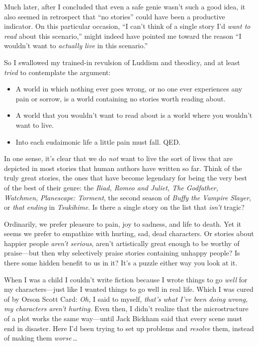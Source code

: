  Much later, after I concluded that even a safe genie
wasn't such a good idea, it also seemed in retrospect
that ``no stories'' could have been
a productive indicator. On this particular occasion,
``I can't think of a single story
I'd \textit{want to read} about this
scenario,'' might indeed have pointed me toward the
reason ``I wouldn't want to
\textit{actually live} in this scenario.''


 So I swallowed my trained-in revulsion of Luddism and theodicy,
and at least \textit{tried} to contemplate the argument:

\begin{itemize}
\item {
 A world in which nothing ever goes wrong, or no one ever
experiences any pain or sorrow, is a world containing no stories worth
reading about.}

\item {
 A world that you wouldn't want to read about is a
world where you wouldn't want to live.}

\item {
  Into each eudaimonic life a little pain must fall. QED.}
\end{itemize}


 In one sense, it's clear that we do \textit{not}
want to live the sort of lives that are depicted in most stories that
human authors have written so far. Think of the truly great stories,
the ones that have become legendary for being the very best of the best
of their genre: the \textit{Iliad, Romeo and Juliet, The Godfather,
Watchmen,} \textit{Planescape: Torment}, the second season of
\textit{Buffy the Vampire Slayer}, or \textit{that ending} in
\textit{Tsukihime}. Is there a single story on the list that
\textit{isn't} tragic?


 Ordinarily, we prefer pleasure to pain, joy to sadness, and life
to death. Yet it seems we prefer to empathize with hurting, sad, dead
characters. Or stories about happier people
\textit{aren't serious}, aren't
artistically great enough to be worthy of praise---but then why
selectively praise stories containing unhappy people? Is there some
hidden benefit to us in it? It's a puzzle either way
you look at it.


 When I was a child I couldn't write fiction
because I wrote things to go \textit{well} for my characters---just
like I wanted things to go well in real life. Which I was cured of by
Orson Scott Card: \textit{Oh,} I said to myself,
\textit{that's what I've been doing
wrong, my characters aren't hurting}. Even then, I
didn't realize that the microstructure of a plot works
the same way---until Jack Bickham said that every scene must end in
disaster. Here I'd been trying to set up problems and
\textit{resolve} them, instead of making them \textit{worse\,\ldots}


